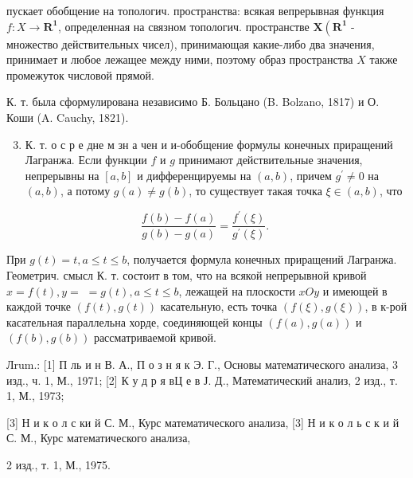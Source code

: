 \documentclass[10pt]{article}
\begin{document}
пускает обобщение на топологич. пространства: всякая вепрерывная функция $f: X \rightarrow \boldsymbol{R}^{\mathbf{1}}$, определенная на связном топологич. пространстве $\boldsymbol{X}\left(\boldsymbol{R}^{\mathbf{1}}\right.$ - множество действительных чисел), принимающая какие-либо два значения, принимает и любое лежащее между ними, поэтому образ пространства $X$ также промежуток числовой прямой.



К. т. была сформулирована независимо Б. Больцано (B. Bolzano, 1817) и О. Коши (A. Cauchy, 1821).



\begin{enumerate}

  \setcounter{enumi}{2}

  \item К. т. о с р е дне м зн а чен и и-обобщение формулы конечных приращений Лагранжа. Если функции $f$ и $g$ принимают действительные значения, непрерывны на $[a, b]$ и дифференцируемы на $(a, b)$, причем $g^{\prime} \neq 0$ на $(a, b)$, а потому $g(a) \neq g(b)$, то существует такая точка $\xi \in(a, b)$, что

\end{enumerate}



\[

\frac{f(b)-f(a)}{g(b)-g(a)}=\frac{f^{\prime}(\xi)}{g^{\prime}(\xi)} \text {. }

\]



При $g(t)=t, a \leqslant t \leqslant b$, получается формула конечных приращений Лагранжа. Геометрич. смысл К. т. состоит в том, что на всякой непрерывной кривой $x=f(t), y=$ $=g(t), a \leqslant t \leqslant b$, лежащей на плоскости $x O y$ и имеющей в каждой точке $(f(t), g(t))$ касательную, есть точка $(f(\xi), g(\xi))$, в к-рой касательная параллельна хорде, соединяющей концы $(f(a), g(a))$ и $(f(b), g(b))$ рассматриваемой кривой.



Лrum.: [1] П ль и н В. А., П о з н я к Э. Г., Основы математического анализа, 3 изд., ч. 1, М., 1971; [2] К у д р я вЦ е в Ј. Д., Математический анализ, 2 изд., т. 1, М., 1973;

[3] Н и к о л с ки й С. М., Курс математического анализа, [3] Н и к о л ь с к и й С. М., Курс математического анализа,

2 изд., т. 1, М., 1975.
\end{document}
